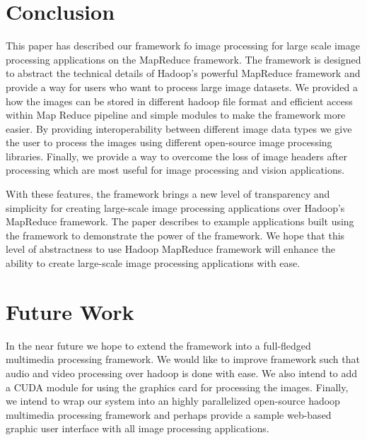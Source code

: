 \documentclass[conference]{IEEEtran}
\begin{document}
\section{Conclusion}
This paper has described our framework fo image processing for large scale image processing applications on the MapReduce framework. The framework is designed to abstract the technical details of Hadoop's powerful MapReduce framework and provide a way for users who want to process large image datasets. We provided a how the images can be stored in different hadoop file format and efficient access within Map Reduce pipeline and simple modules to make the framework more easier. By providing interoperability between different image data types we give the user to process the images using different open-source image processing libraries. Finally, we provide a way to overcome the loss of image headers after processing which are most useful for image processing and vision applications.

With these features, the framework brings a new level of transparency and simplicity for creating large-scale image processing applications over Hadoop's MapReduce framework. The paper describes to example applications built using the framework to demonstrate the power of the framework. We hope that this level of abstractness to use Hadoop MapReduce framework will enhance the ability to create large-scale image processing applications with ease.

\section{Future Work}
In the near future we hope to extend the framework into a full-fledged multimedia processing framework. We would like to improve framework such that audio and video processing over hadoop is done with ease. We also intend to add a CUDA module for using the graphics card for processing the images. Finally, we intend to wrap our system into an highly parallelized open-source hadoop multimedia processing framework and perhaps provide a sample web-based graphic user interface with all image processing applications.  

	
	
\end{document}
